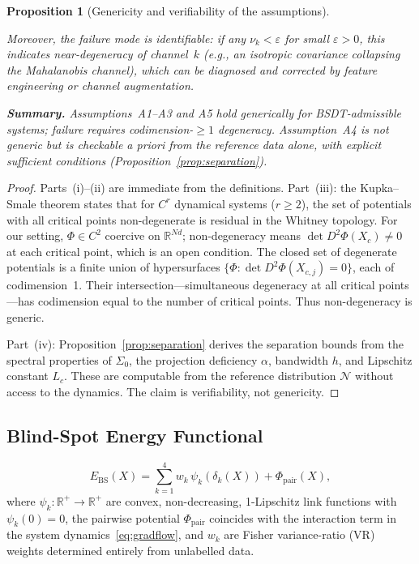 \documentclass[11pt,a4paper]{article}
\newcommand{\R}{\mathbb{R}}
\newcommand{\Ebs}{E_{\mathrm{BS}}}
\newtheorem{proposition}[theorem]{Proposition}
\begin{document}
\begin{proposition}[Genericity and verifiability of the assumptions]
\begin{enumerate}[nosep]
    Moreover, the failure mode is identifiable: if any
    $\nu_k < \varepsilon$ for small $\varepsilon > 0$, this
    indicates near-degeneracy of channel~$k$ (e.g., an
    isotropic covariance collapsing the Mahalanobis channel),
    which can be diagnosed and corrected by feature engineering
    or channel augmentation.
\end{enumerate}

\medskip
\noindent\textbf{Summary.}
Assumptions~A1--A3 and A5 hold generically for BSDT-admissible
systems; failure requires codimension-$\ge 1$ degeneracy.
Assumption~A4 is not generic but is \emph{checkable a priori}
from the reference data alone, with explicit sufficient conditions
(Proposition~\ref{prop:separation}).
\end{proposition}

\begin{proof}
Parts~(i)--(ii) are immediate from the definitions.
Part~(iii): the Kupka--Smale theorem \cite{kupka1963,smale1963}
states that for $C^r$ dynamical systems ($r \ge 2$), the set of
potentials with all critical points non-degenerate is residual
in the Whitney topology.  For our setting, $\Phi \in C^2$
coercive on $\R^{Nd}$; non-degeneracy means
$\det D^2\Phi(X_c) \ne 0$ at each critical point, which is
an open condition.  The closed set of degenerate potentials
is a finite union of hypersurfaces
$\{\Phi : \det D^2\Phi(X_{c,j}) = 0\}$, each of codimension~1.
Their intersection---simultaneous degeneracy at all critical
points---has codimension equal to the number of critical points.
Thus non-degeneracy is generic.

Part~(iv): Proposition~\ref{prop:separation} derives the
separation bounds from the spectral properties of $\Sigma_0$,
the projection deficiency $\alpha$, bandwidth $h$, and
Lipschitz constant $L_c$.  These are computable from the
reference distribution $\mathcal{N}$ without access to the
dynamics.  The claim is verifiability, not genericity.
\end{proof}

\subsection{Blind-Spot Energy Functional}

\begin{equation}\label{eq:ebs}
  \Ebs(X) = \sum_{k=1}^{4} w_k \, \psi_k(\delta_k(X))
  + \Phi_{\mathrm{pair}}(X),
\end{equation}
where $\psi_k:\R^+\to\R^+$ are convex, non-decreasing, 1-Lipschitz
link functions with $\psi_k(0)=0$, the pairwise potential
$\Phi_{\mathrm{pair}}$ coincides with the interaction term in the
system dynamics~\eqref{eq:gradflow}, and $w_k$ are Fisher
variance-ratio (VR) weights determined entirely from unlabelled data.
\end{document}
